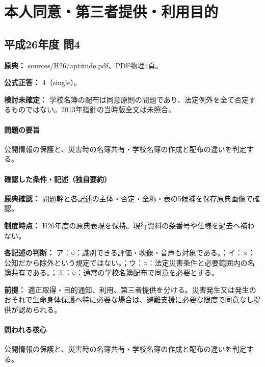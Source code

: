 \section{本人同意・第三者提供・利用目的}

\subsection{平成26年度 問4}
\label{q:h26-reg-apt-04}

\noindent\textbf{原典：} sources/H26/aptitude.pdf、PDF物理4頁。

\textbf{公式正答：} 4（single）。

\par\textbf{検討未確定：} 学校名簿の配布は同意原則の問題であり、法定例外を全て否定するものではない。2013年指針の当時版全文は未照合。

\paragraph{問題の要旨} 公開情報の保護と、災害時の名簿共有・学校名簿の作成と配布の違いを判定する。

\paragraph{確認した条件・記述（独自要約）}\mbox{}\par

\noindent\textbf{原典確認：} 問題幹と各記述の主体・否定・全称・表の5候補を保存原典画像で確認。\par

\noindent\textbf{制度時点：} H26年度の原典表現を保持。現行資料の条番号や仕様を過去へ補わない。\par

\noindent\textbf{各記述の判断：} ア：○：識別できる評価・映像・音声も対象である。；イ：×：公知だから除外という規定ではない。；ウ：○：法定災害条件と必要範囲内の名簿共有である。；エ：○：通常の学校名簿配布で同意を必要とする。\par

\noindent\textbf{前提：} 適正取得・目的通知、利用、第三者提供を分ける。災害発生又は発生のおそれで生命身体保護へ特に必要な場合は、避難支援に必要な限度で同意なし提供が認められる。\par

\paragraph{問われる核心} 公開情報の保護と、災害時の名簿共有・学校名簿の作成と配布の違いを判定する。


